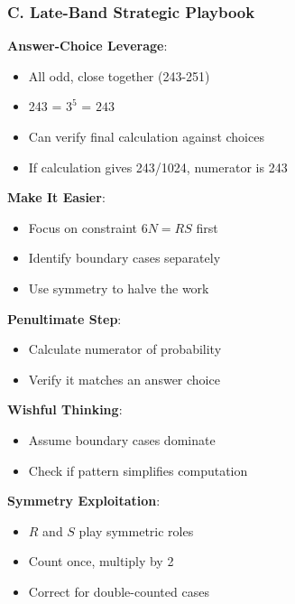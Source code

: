 \documentclass[12pt]{article}
\begin{document}
\begin{strategicbox}
\subsubsection*{C. Late-Band Strategic Playbook}

\textbf{Answer-Choice Leverage}:
\begin{itemize}
    \item All odd, close together (243-251)
    \item 243 = $3^5$ = $243$
    \item Can verify final calculation against choices
    \item If calculation gives 243/1024, numerator is 243
\end{itemize}

\textbf{Make It Easier}:
\begin{itemize}
    \item Focus on constraint $6N = RS$ first
    \item Identify boundary cases separately
    \item Use symmetry to halve the work
\end{itemize}

\textbf{Penultimate Step}:
\begin{itemize}
    \item Calculate numerator of probability
    \item Verify it matches an answer choice
\end{itemize}

\textbf{Wishful Thinking}:
\begin{itemize}
    \item Assume boundary cases dominate
    \item Check if pattern simplifies computation
\end{itemize}

\textbf{Symmetry Exploitation}:
\begin{itemize}
    \item $R$ and $S$ play symmetric roles
    \item Count once, multiply by 2
    \item Correct for double-counted cases
\end{itemize}

\end{strategicbox}
\end{document}
